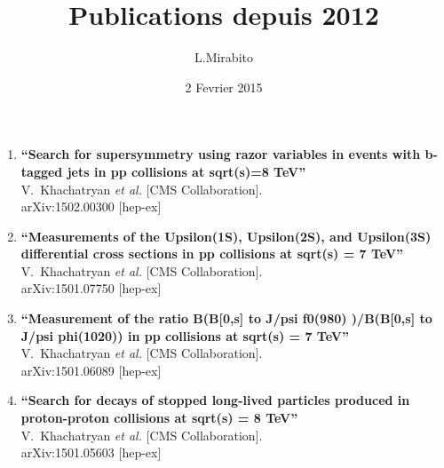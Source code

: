 \documentclass{article}
\begin{document}
\title{Publications depuis 2012}
\author{L.Mirabito}
\date{2 Fevrier 2015}
\maketitle
\begin{enumerate}

\item%
{\bf ``Search for supersymmetry using razor variables in events with b-tagged jets in pp collisions at sqrt(s)=8 TeV''}
  \\{}V.~Khachatryan {\it et al.}  [CMS Collaboration].
  \\{}arXiv:1502.00300 [hep-ex]
  


\item%
{\bf ``Measurements of the Upsilon(1S), Upsilon(2S), and Upsilon(3S) differential cross sections in pp collisions at sqrt(s) = 7 TeV''}
  \\{}V.~Khachatryan {\it et al.}  [CMS Collaboration].
  \\{}arXiv:1501.07750 [hep-ex]
  



\item%
{\bf ``Measurement of the ratio B(B[0,s] to J/psi f0(980) )/B(B[0,s] to J/psi phi(1020)) in pp collisions at sqrt(s) = 7 TeV''}
  \\{}V.~Khachatryan {\it et al.}  [CMS Collaboration].
  \\{}arXiv:1501.06089 [hep-ex]
  



\item%
{\bf ``Search for decays of stopped long-lived particles produced in proton-proton collisions at sqrt(s) = 8 TeV''}
  \\{}V.~Khachatryan {\it et al.}  [CMS Collaboration].
  \\{}arXiv:1501.05603 [hep-ex]
  

\end{enumerate}
\end{document}
